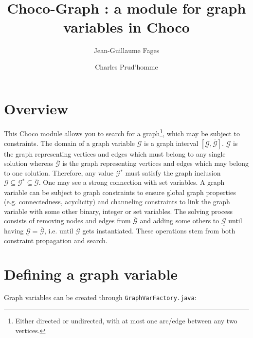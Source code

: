 \documentclass{doc}
\begin{document}
\author{Jean-Guillaume Fages \and Charles Prud'homme }                       
\title{Choco-Graph : a module for graph variables in Choco}
\maketitle

\newcommand{\GV}{\ensuremath{\mathcal{G}}}
\newcommand{\GLB}{\ensuremath{\underline{\mathcal{G}}}}
\newcommand{\GUB}{\ensuremath{\overline{\mathcal{G}}}}

\section{Overview}

This Choco module allows you to search for a graph\footnote{Either directed or undirected, with at most one arc/edge between any two vertices. }, which may be subject to constraints. 
%
The domain of a graph variable \GV{} is a graph interval $[\GLB{},\GUB{}]$. \GLB{} is the graph representing vertices and edges which must belong to any single solution whereas \GUB{} is the graph representing vertices and edges which may belong to one solution. Therefore, any value $\GV{}^*$ must satisfy the graph inclusion $\GLB{} \subseteq \GV{}^* \subseteq \GUB{}$. One may see a strong connection with set variables.
%
A graph variable can be subject to graph constraints to ensure global graph properties (e.g. connectedness, acyclicity) and channeling constraints to link the graph variable with some other binary, integer or set variables. 
%
The solving process consists of removing nodes and edges from \GUB{} and adding some others to \GLB{} until having $\GLB{} = \GUB{}$, i.e. until \GV{} gets instantiated. These operations stem from both constraint propagation and search. 

\section{Defining a graph variable}

Graph variables can be created through \texttt{GraphVarFactory.java}:
\end{document}
